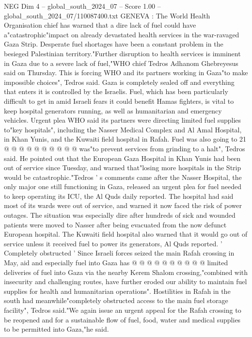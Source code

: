 \begin{textsample}{NEG Dim 4 – global\_south\_2024\_07 – Score 1.00 – global\_south\_2024\_07/110087400.txt}  \label{ex:f4_neg_348}
GENEVA : The World Health Organisation chief has warned that a dire lack of fuel could have a"catastrophic"impact on already devastated health services in the war-ravaged Gaza Strip.
Desperate fuel shortages have been a constant problem in the besieged Palestinian territory."Further disruption to health services is imminent in Gaza due to a severe lack of fuel,"WHO chief Tedros Adhanom Ghebreyesus said on Thursday.
This is forcing WHO and its partners working in Gaza"to make impossible choices", Tedros said.
Gaza is completely sealed off and everything that enters it is controlled by the Israelis.
Fuel, which has been particularly difficult to get in amid Israeli fears it could benefit Hamas fighters, is vital to keep hospital generators running, as well as humanitarian and emergency vehicles.
Urgent plea WHO said its partners were directing limited fuel supplies to"key hospitals", including the Nasser Medical Complex and Al Amal Hospital, in Khan Yunis, and the Kuwaiti field hospital in Rafah.
Fuel was also going to 21 @ @ @ @ @ @ @ @ @ @ was"to prevent services from grinding to a halt", Tedros said.
He pointed out that the European Gaza Hospital in Khan Yunis had been out of service since Tuesday, and warned that"losing more hospitals in the Strip would be catastrophic."Tedros ' s comments came after the Nasser Hospital, the only major one still functioning in Gaza, released an urgent plea for fuel needed to keep operating its ICU, the Al Quds daily reported.
The hospital had said most of its wards were out of service, and warned it now faced the risk of power outages.
The situation was especially dire after hundreds of sick and wounded patients were moved to Nasser after being evacuated from the now defunct European hospital.
The Kuwaiti field hospital also warned that it would go out of service unless it received fuel to power its generators, Al Quds reported. ' Completely obstructed ' Since Israeli forces seized the main Rafah crossing in May, aid and especially fuel into Gaza has @ @ @ @ @ @ @ @ @ @ limited deliveries of fuel into Gaza via the nearby Kerem Shalom crossing,"combined with insecurity and challenging routes, have further eroded our ability to maintain fuel supplies for health and humanitarian operations".
Hostilities in Rafah in the south had meanwhile"completely obstructed access to the main fuel storage facility", Tedros said."We again issue an urgent appeal for the Rafah crossing to be reopened and for a sustainable flow of fuel, food, water and medical supplies to be permitted into Gaza,"he said.

\end{textsample}

